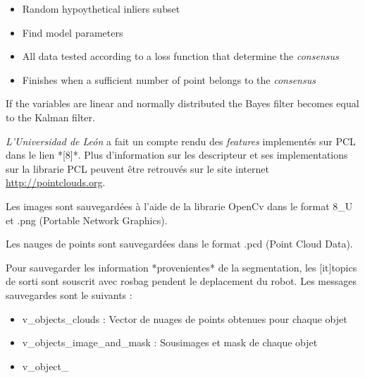 \begin{itemize}
\item Random hypoythetical inliers subset
\item Find model parameters
\item All data tested according to a loss function that determine the \textit{consensus}
\item Finishes when a sufficient number of point belongs to the \textit{consensus}
\end{itemize}

\center \large{\color{blue} If the variables are linear and normally distributed the Bayes filter becomes equal to the Kalman filter.}



\textit{L'Universidad de León } a fait un compte rendu des
\textit{features} implementés sur PCL dans le lien *[8]*. Plus
d'information sur les descripteur et ses implementations sur la
librarie PCL peuvent être retrouvés sur le site
internet \url{http://pointclouds.org}.

Les images sont sauvegardées à l'aide de la librarie OpenCv dans le format 8\_U et .png (Portable Network Graphics).

Les nauges de points sont sauvegardées dans le format .pcd (Point Cloud Data).

Pour sauvegarder les information *provenientes* de la segmentation, les [it]topics de sorti sont souscrit avec rosbag pendent le deplacement du robot. Les messages sauvegardes sont le suivants :

\begin{itemize}
\item v\_objects\_clouds : Vector de nuages de points obtenues pour chaque objet 

\item v\_objects\_image\_and\_mask : Sousimages et mask de chaque objet

\item v\_object\_

\end{itemize}


